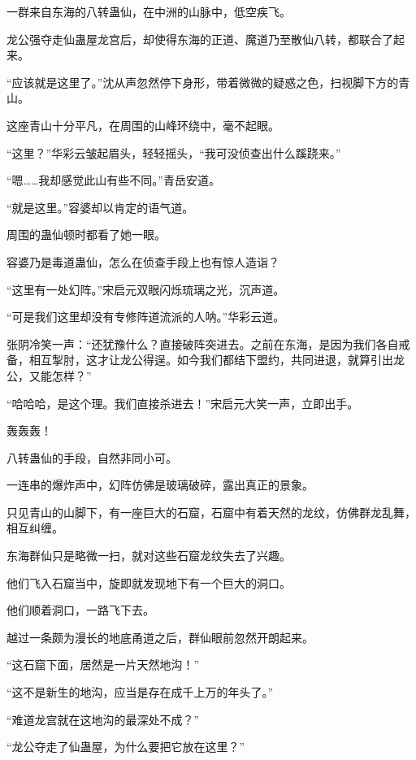 
\begin{this_body}



一群来自东海的八转蛊仙，在中洲的山脉中，低空疾飞。

龙公强夺走仙蛊屋龙宫后，却使得东海的正道、魔道乃至散仙八转，都联合了起来。

“应该就是这里了。”沈从声忽然停下身形，带着微微的疑惑之色，扫视脚下方的青山。

这座青山十分平凡，在周围的山峰环绕中，毫不起眼。

“这里？”华彩云皱起眉头，轻轻摇头，“我可没侦查出什么蹊跷来。”

“嗯……我却感觉此山有些不同。”青岳安道。

“就是这里。”容婆却以肯定的语气道。

周围的蛊仙顿时都看了她一眼。

容婆乃是毒道蛊仙，怎么在侦查手段上也有惊人造诣？

“这里有一处幻阵。”宋启元双眼闪烁琉璃之光，沉声道。

“可是我们这里却没有专修阵道流派的人呐。”华彩云道。

张阴冷笑一声：“还犹豫什么？直接破阵突进去。之前在东海，是因为我们各自戒备，相互掣肘，这才让龙公得逞。如今我们都结下盟约，共同进退，就算引出龙公，又能怎样？”

“哈哈哈，是这个理。我们直接杀进去！”宋启元大笑一声，立即出手。

轰轰轰！

八转蛊仙的手段，自然非同小可。

一连串的爆炸声中，幻阵仿佛是玻璃破碎，露出真正的景象。

只见青山的山脚下，有一座巨大的石窟，石窟中有着天然的龙纹，仿佛群龙乱舞，相互纠缠。

东海群仙只是略微一扫，就对这些石窟龙纹失去了兴趣。

他们飞入石窟当中，旋即就发现地下有一个巨大的洞口。

他们顺着洞口，一路飞下去。

越过一条颇为漫长的地底甬道之后，群仙眼前忽然开朗起来。

“这石窟下面，居然是一片天然地沟！”

“这不是新生的地沟，应当是存在成千上万的年头了。”

“难道龙宫就在这地沟的最深处不成？”

“龙公夺走了仙蛊屋，为什么要把它放在这里？”


\end{this_body}
